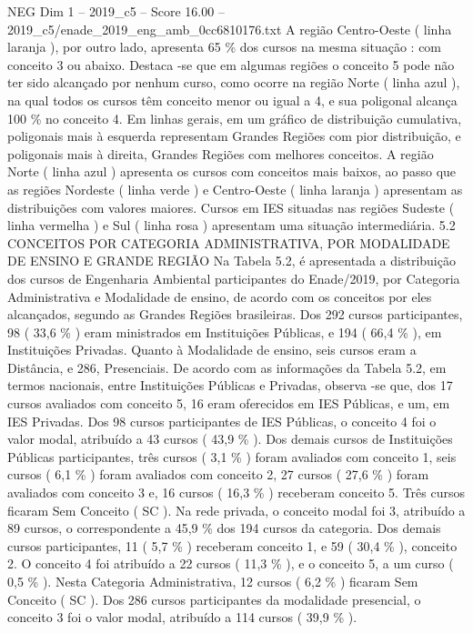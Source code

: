 \begin{textsample}{NEG Dim 1 – 2019\_c5 – Score 16.00 – 2019\_c5/enade\_2019\_eng\_amb\_0cc6810176.txt}
A região Centro-Oeste ( linha laranja ), por outro lado, apresenta 65 \% dos cursos na mesma situação : com conceito 3 ou abaixo.
Destaca -se que em algumas regiões o conceito 5 pode não ter sido alcançado por nenhum curso, como ocorre na região Norte ( linha azul ), na qual todos os cursos têm conceito menor ou igual a 4, e sua poligonal alcança 100 \% no conceito 4.
Em linhas gerais, em um gráfico de distribuição cumulativa, poligonais mais à esquerda representam Grandes Regiões com pior distribuição, e poligonais mais à direita, Grandes Regiões com melhores conceitos.
A região Norte ( linha azul ) apresenta os cursos com conceitos mais baixos, ao passo que as regiões Nordeste ( linha verde ) e Centro-Oeste ( linha laranja ) apresentam as distribuições com valores maiores.
Cursos em IES situadas nas regiões Sudeste ( linha vermelha ) e Sul ( linha rosa ) apresentam uma situação intermediária. 5.2 CONCEITOS POR CATEGORIA ADMINISTRATIVA, POR MODALIDADE DE ENSINO E GRANDE REGIÃO Na Tabela 5.2, é apresentada a distribuição dos cursos de Engenharia Ambiental participantes do Enade/2019, por Categoria Administrativa e Modalidade de ensino, de acordo com os conceitos por eles alcançados, segundo as Grandes Regiões brasileiras.
Dos 292 cursos participantes, 98 ( 33,6 \% ) eram ministrados em Instituições Públicas, e 194 ( 66,4 \% ), em Instituições Privadas.
Quanto à Modalidade de ensino, seis cursos eram a Distância, e 286, Presenciais.
De acordo com as informações da Tabela 5.2, em termos nacionais, entre Instituições Públicas e Privadas, observa -se que, dos 17 cursos avaliados com conceito 5, 16 eram oferecidos em IES Públicas, e um, em IES Privadas.
Dos 98 cursos participantes de IES Públicas, o conceito 4 foi o valor modal, atribuído a 43 cursos ( 43,9 \% ).
Dos demais cursos de Instituições Públicas participantes, três cursos ( 3,1 \% ) foram avaliados com conceito 1, seis cursos ( 6,1 \% ) foram avaliados com conceito 2, 27 cursos ( 27,6 \% ) foram avaliados com conceito 3 e, 16 cursos ( 16,3 \% ) receberam conceito 5.
Três cursos ficaram Sem Conceito ( SC ).
Na rede privada, o conceito modal foi 3, atribuído a 89 cursos, o correspondente a 45,9 \% dos 194 cursos da categoria.
Dos demais cursos participantes, 11 ( 5,7 \% ) receberam conceito 1, e 59 ( 30,4 \% ), conceito 2.
O conceito 4 foi atribuído a 22 cursos ( 11,3 \% ), e o conceito 5, a um curso ( 0,5 \% ).
Nesta Categoria Administrativa, 12 cursos ( 6,2 \% ) ficaram Sem Conceito ( SC ).
Dos 286 cursos participantes da modalidade presencial, o conceito 3 foi o valor modal, atribuído a 114 cursos ( 39,9 \% ).

\end{textsample}
